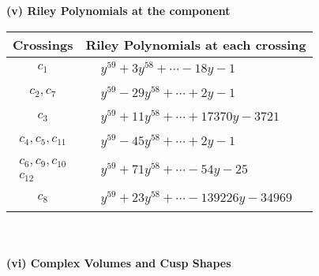 \documentclass[1p]{elsarticle_modified}
\theoremstyle{definition}
\begin{document}
\newpage\renewcommand{\arraystretch}{1}
\flushleft \textbf{(v) Riley Polynomials at the component}\newline \\
\begin{tabular}{m{50pt}|m{274pt}}
Crossings & \hspace{64pt}Riley Polynomials at each crossing \\
\hline $$\begin{aligned}c_{1}\end{aligned}$$&$\begin{aligned}
&y^{59}+3 y^{58}+\cdots-18 y-1
\end{aligned}$\\
\hline $$\begin{aligned}c_{2},c_{7}\end{aligned}$$&$\begin{aligned}
&y^{59}-29 y^{58}+\cdots+2 y-1
\end{aligned}$\\
\hline $$\begin{aligned}c_{3}\end{aligned}$$&$\begin{aligned}
&y^{59}+11 y^{58}+\cdots+17370 y-3721
\end{aligned}$\\
\hline $$\begin{aligned}c_{4},c_{5},c_{11}\end{aligned}$$&$\begin{aligned}
&y^{59}-45 y^{58}+\cdots+2 y-1
\end{aligned}$\\
\hline $$\begin{aligned}c_{6},c_{9},c_{10}\\c_{12}\end{aligned}$$&$\begin{aligned}
&y^{59}+71 y^{58}+\cdots-54 y-25
\end{aligned}$\\
\hline $$\begin{aligned}c_{8}\end{aligned}$$&$\begin{aligned}
&y^{59}+23 y^{58}+\cdots-139226 y-34969
\end{aligned}$\\
\hline
\end{tabular}\\~\\
\newpage\flushleft \textbf{(vi) Complex Volumes and Cusp Shapes}
\end{document}
